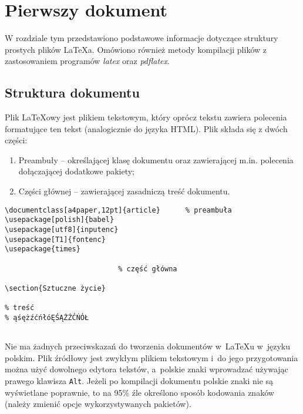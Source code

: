 
\chapter{Pierwszy dokument}
\label{cha:pierwszyDokument}

W rozdziale tym przedstawiono podstawowe informacje dotyczące struktury prostych plików \LaTeX a. Omówiono również metody kompilacji plików z zastosowaniem programów \emph{latex} oraz \emph{pdflatex}.



\section{Struktura dokumentu}
\label{sec:strukturaDokumentu}

Plik \LaTeX owy jest plikiem tekstowym, który oprócz tekstu zawiera polecenia formatujące ten tekst (analogicznie do języka HTML). Plik składa się z dwóch części:
\begin{enumerate}%
	\item Preambuły -- określającej klasę dokumentu oraz zawierającej m.in. polecenia dołączającej dodatkowe pakiety;
	
	\item Części głównej -- zawierającej zasadniczą treść dokumentu.
\end{enumerate}


\begin{lstlisting}
\documentclass[a4paper,12pt]{article}      % preambuła
\usepackage[polish]{babel}
\usepackage[utf8]{inputenc}
\usepackage[T1]{fontenc}
\usepackage{times}

                           % część główna

\section{Sztuczne życie}

% treść
% ąśężźćńłóĘŚĄŻŹĆŃÓŁ


\end{lstlisting}

Nie ma żadnych przeciwskazań do tworzenia dokumentów w~\LaTeX u w~języku polskim. Plik źródłowy jest zwykłym plikiem tekstowym i~do jego przygotowania można użyć dowolnego edytora tekstów, a~polskie znaki wprowadzać używając prawego klawisza \texttt{Alt}. Jeżeli po kompilacji dokumentu polskie znaki nie są wyświetlane poprawnie, to na 95\% źle określono sposób kodowania znaków (należy zmienić opcje wykorzystywanych pakietów).


